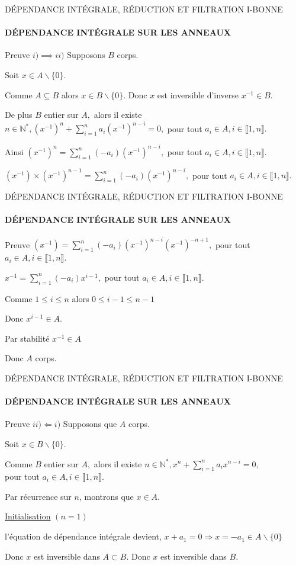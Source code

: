 \documentclass[11pt,a4paper]{beamer}
\begin{document}
\begin{frame}{DÉPENDANCE INTÉGRALE, RÉDUCTION ET FILTRATION I-BONNE}
	\framesubtitle{DÉPENDANCE INTÉGRALE SUR LES ANNEAUX}
	\begin{block}{Preuve}
		$i) \implies  ii)$ Supposons $B$ corps.
		
		Soit $x\in A\backslash \{0\}.$
		
		Comme $A\subseteq B$ alors $x\in B\backslash \{0\}$. Donc $x$ est inversible d'inverse $x^{-1}\in B.$
		
		De plus $B$ entier sur $A,$ alors il existe $n\in \mathbb{N}^{\ast },(x^{-1})^{n}+\sum\limits_{i=1}^{n}a_{i}(x^{-1})^{n-i}=0,$ pour tout 
		$a_{i}\in A,i\in \llbracket 1, n \rrbracket.$
		
		Ainsi $(x^{-1})^{n}=\sum\limits_{i=1}^{n}(-a_{i})(x^{-1})^{n-i},$ pour tout $%
		a_{i}\in A,i\in \llbracket 1, n \rrbracket.$
		
		$(x^{-1})\times (x^{-1})^{n-1}=\sum\limits_{i=1}^{n}(-a_{i})(x^{-1})^{n-i},$
		pour tout $a_{i}\in A,i\in \llbracket 1, n \rrbracket.$
	\end{block}
\end{frame}

\begin{frame}{DÉPENDANCE INTÉGRALE, RÉDUCTION ET FILTRATION I-BONNE}
	\framesubtitle{DÉPENDANCE INTÉGRALE SUR LES ANNEAUX}
	\begin{block}{Preuve}
		$(x^{-1})=\sum\limits_{i=1}^{n}(-a_{i})(x^{-1})^{n-i}(x^{-1})^{-n+1},$ pour
		tout $a_{i}\in A,i\in \llbracket 1, n \rrbracket.$
		
		$x^{-1}=\sum\limits_{i=1}^{n}(-a_{i})x^{i-1},$ pour tout $a_{i}\in A,i\in
		\llbracket 1, n \rrbracket.$
		
		Comme  $1\leq i\leq n$ alors $0\leq i-1\leq n-1$
		
		Donc $x^{i-1}\in A$.
		
		Par stabilité $x^{-1}\in A$
		
		Donc $A$ corps.
	\end{block}
\end{frame}

\begin{frame}{DÉPENDANCE INTÉGRALE, RÉDUCTION ET FILTRATION I-BONNE}
	\framesubtitle{DÉPENDANCE INTÉGRALE SUR LES ANNEAUX}
	\begin{block}{Preuve}
			$ii)\Longleftarrow i)$ Supposons que $A$ corps.
		
		Soit $x\in B\backslash \{0\}.$
		
		Comme $B$ entier sur $A,$ alors il existe $n\in \mathbb{N}^{\ast },x^{n}+\sum\limits_{i=1}^{n}a_{i}x^{n-i}=0,$\\ pour tout $a_{i}\in
		A,i\in \llbracket 1, n \rrbracket.$
		
		Par récurrence sur $n$, montrons que $x\in A.$
		
		\underline{Initialisation} $(n=1)$
		
		l'équation de dépendance intégrale devient, $x+a_{1}=0%
		\Rightarrow x=-a_{1}\in A\backslash \{0\}$
		
		Donc $x$ est inversible dans $A\subset B.$ Donc $x$ est inversible dans $B.$
	\end{block}
\end{frame}
\end{document}
